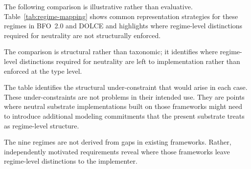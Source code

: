 The following comparison is illustrative rather than evaluative.
Table~\ref{tab:regime-mapping} shows common representation
strategies for these regimes in BFO~2.0 and DOLCE and highlights
where regime-level distinctions required for neutrality are not
structurally enforced.

The comparison is structural rather than taxonomic;
it identifies where regime-level distinctions
required for neutrality are left to implementation
rather than enforced at the type level.

The table identifies the structural under-constraint that would arise in each case.
These under-constraints are not problems in their intended use.
They are points where neutral substrate implementations built on those frameworks
might need to introduce additional modeling commitments
that the present substrate treats as regime-level structure.

The nine regimes are not derived from gaps in existing frameworks.
Rather, independently motivated requirements reveal where those frameworks
leave regime-level distinctions to the implementer.

